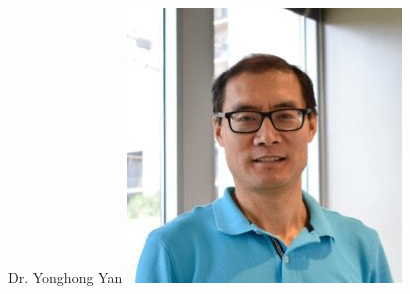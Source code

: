 \documentclass[aspectratio=169]{beamer}
\begin{document}
\begin{frame}
\begin{columns}
    Dr. Yonghong Yan
    \includegraphics[trim={4em 0 4em 0}, clip, width=.9\linewidth]{pics/Yan.jpg}

  \end{columns}
  
\end{frame}
\end{document}
